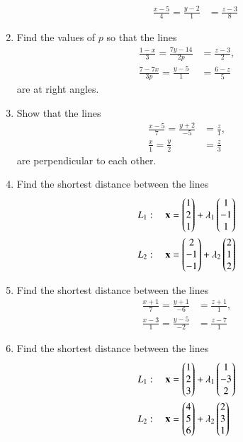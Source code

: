 \begin{enumerate}[label=\arabic*.,ref=\thesubsection.\theenumi]
\begin{enumerate}
\begin{align}
\\
\frac{x-5}{4} = \frac{y-2}{1} &= \frac{z-3}{8} 
\end{align}
\end{enumerate}
\item Find the values of $p$ so that the lines 
\begin{align}
\frac{1-x}{3} = \frac{7y-14}{2p} &= \frac{z-3}{2}, 
\\
\frac{7-7x}{3p} = \frac{y-5}{1} &= \frac{6-z}{5} 
\end{align}
are at right angles.
\\
\solution

\item Show that the lines 
\begin{align}
\frac{x-5}{7} = \frac{y+2}{-5} &= \frac{z}{1}, 
\\
\frac{x}{1} = \frac{y}{2} &= \frac{z}{3} 
\end{align}
%
are perpendicular to each other.
\\
\solution

\item Find the shortest distance between the lines 
\begin{align}
L_1: \quad \mathbf{x} &= \begin{pmatrix}1\\2\\1\end{pmatrix} + \lambda_1\begin{pmatrix}1 \\ -1 \\1\end{pmatrix}
\\
L_2: \quad \mathbf{x} &= \begin{pmatrix}2\\-1\\-1\end{pmatrix} + \lambda_2\begin{pmatrix}2 \\ 1 \\2\end{pmatrix}
\end{align}
\item Find the shortest distance between the lines 
\begin{align}
\frac{x+1}{7} = \frac{y+1}{-6} &= \frac{z+1}{1}, 
\\
\frac{x-3}{1} = \frac{y-5}{-2} &= \frac{z-7}{1} 
\end{align}
%
\item Find the shortest distance between the lines 
\begin{align}
L_1: \quad \vec{x} &= \myvec{1\\2\\3} + \lambda_1\myvec{1 \\ -3 \\2}
\\
L_2: \quad \vec{x} &= \myvec{4\\5\\6} + \lambda_2\myvec{2 \\ 3 \\1}

\end{align}
\end{enumerate}
